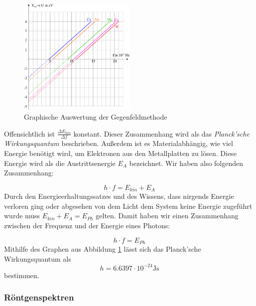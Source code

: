 \documentclass[a4paper]{article}
\begin{document}
				\begin{figure}[H]
					\centering
					\includegraphics[width=0.5\textwidth]{img/wirkungsquantum01_quantenobjektp_ver.png}
					\caption{Graphische Auswertung der Gegenfeldmethode}
					\label{img:wirkungsquantum01_quantenobjektp_ver}
				\end{figure}
				\noindent Offensichtlich ist $\frac{\Delta E_{kin}}{\Delta f}$ konstant. Dieser Zusammenhang wird als das \textit{Planck'sche Wirkungsquantum} beschrieben. Außerdem ist es Materialabhängig, wie viel Energie benötigt wird, um Elektronen aus den Metallplatten zu lösen. Diese Energie wird als die Austrittsenergie $E_A$ bezeichnet. Wir haben also folgenden Zusammenhang:
				
				\begin{equation}
					h\cdot f=E_{kin}+ E_A
				\end{equation}
				Durch den Energieerhaltungssatzes und des Wissens, dass nirgends Energie verloren ging oder abgesehen von dem Licht dem System keine Energie zugeführt wurde muss $E_{kin}+ E_A=E_{Ph}$ gelten. Damit haben wir einen Zusammenhang zwischen der Frequenz und der Energie eines Photons:
				
				\begin{equation}
				h\cdot f=E_{Ph}
				\end{equation}
				Mithilfe des Graphen aus Abbildung \ref{img:wirkungsquantum01_quantenobjektp_ver} lässt sich das Planck'sche Wirkungsquantum als
				\begin{equation}
				h = 6.6397 \cdot 10^{-24} \si{\joule\second}
				\end{equation}
				bestimmen.
				
				
			
			\subsubsection{Röntgenspektren}
			
\end{document}
